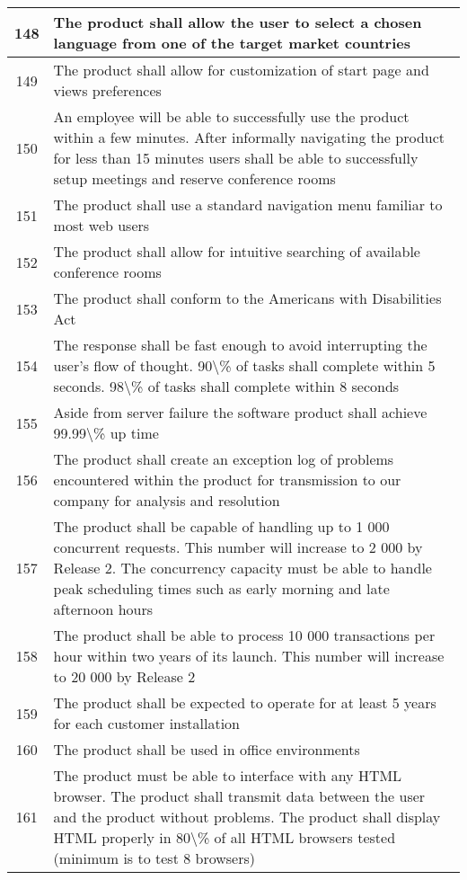 \begin{table}
{\begin{tabularx}{\textwidth}{cX}
    148   & The product shall allow the user to select a chosen language from one of the target market countries \\ \midrule
    149   & The product shall allow for customization of start page and views preferences \\    \midrule
    150   & An employee will be able to successfully use the product within a few minutes. After informally navigating the product for less than 15 minutes users shall be able to successfully setup meetings and reserve conference rooms \\    \midrule
    151   & The product shall use a standard navigation menu familiar to most web users \\    \midrule
    152   & The product shall allow for intuitive searching of available conference rooms \\    \midrule
    153   & The product shall conform to the Americans with Disabilities Act \\    \midrule
    154   & The response shall be fast enough to avoid interrupting the user's flow of thought. 90\textbackslash{}\% of tasks shall complete within 5 seconds. 98\textbackslash{}\% of tasks shall complete within 8 seconds \\    \midrule
    155   & Aside from server failure the software product shall achieve 99.99\textbackslash{}\% up time \\    \midrule
    156   & The product shall create an exception log of problems encountered within the product for transmission to our company for analysis and resolution \\    \midrule
    157   & The product shall be capable of handling up to 1 000 concurrent requests. This number will increase to 2 000 by Release 2. The concurrency capacity must be able to handle peak scheduling times such as early morning and late afternoon hours \\    \midrule
    158   & The product shall be able to process 10 000 transactions per hour within two years of its launch. This number will increase to 20 000 by Release 2 \\    \midrule
    159   & The product shall be expected to operate for at least 5 years for each customer installation \\    \midrule
    160   & The product shall be used in office environments \\    \midrule
    161   & The product must be able to interface with any HTML browser. The product shall transmit data between the user and the product without problems. The product shall display HTML properly in 80\textbackslash{}\% of all HTML browsers tested (minimum is to test 8 browsers) \\    \midrule

\end{tabularx}}
\end{table}
